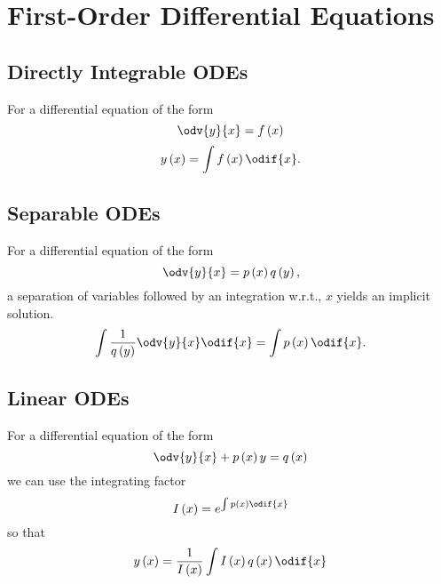 \documentclass{article}
\begin{document}
\section{First-Order Differential Equations}
\subsection{Directly Integrable ODEs}
For a differential equation of the form
\begin{equation*}
    \odv{y}{x} = f\left( x \right)
\end{equation*}
\begin{equation*}
    y\left( x \right) = \int f\left( x \right) \odif{x}.
\end{equation*}
\subsection{Separable ODEs}
For a differential equation of the form
\begin{equation*}
    \odv{y}{x} = p\left( x \right) q\left( y \right),
\end{equation*}
a separation of variables followed by an integration w.r.t., \(x\)
yields an implicit solution.
\begin{equation*}
    \int \frac{1}{q\left( y \right)} \odv{y}{x} \odif{x} = \int p\left( x \right) \odif{x}.
\end{equation*}
\subsection{Linear ODEs}
For a differential equation of the form
\begin{equation*}
    \odv{y}{x} + p\left( x \right)y = q\left( x \right)
\end{equation*}
we can use the integrating factor
\begin{equation*}
    I\left( x \right) = e^{\int p\left( x \right) \odif{x}}
\end{equation*}
so that
\begin{equation*}
    y\left( x \right) = \frac{1}{I\left( x \right)} \int I\left( x \right) q\left( x \right) \odif{x}
\end{equation*}
\end{document}
